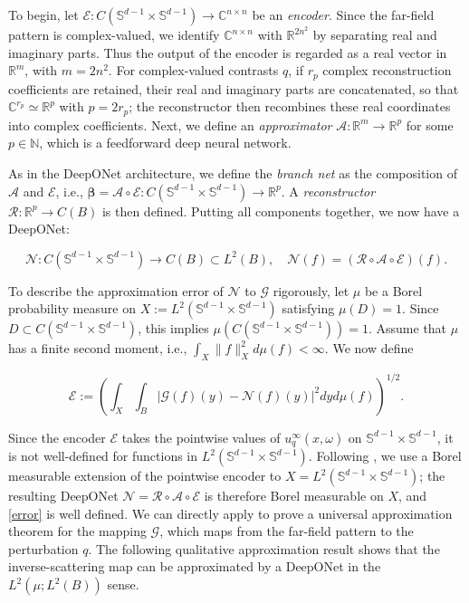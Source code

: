 \documentclass{article}
\numberwithin{equation}{section}
\theoremstyle{plain}
\begin{document}
	To begin, let $\mathcal{E}:C(\mathbb{S}^{d-1}\times\mathbb{S}^{d-1}) \to\mathbb{C}^{n\times n}$ be an \textit{encoder}. Since the far-field pattern is complex-valued, we identify
	\(\mathbb C^{n\times n}\) with \(\mathbb R^{2n^2}\) by separating real and imaginary parts. Thus the output of the encoder is regarded as a real vector in \(\mathbb R^m\), with \(m=2n^2\). For complex-valued contrasts $q$, if $r_p$ complex reconstruction coefficients are retained, their real and imaginary parts are concatenated, so that $\mathbb C^{r_p}\simeq\mathbb R^p$ with $p=2r_p$; the reconstructor then recombines these real coordinates into complex coefficients.
	Next, we define an \textit{approximator} $\mathcal{A}:\mathbb{R}^{m}\to\mathbb{R}^{p}$ for some $p\in\mathbb{N}$, which is a feedforward deep neural network.
	
	As in the DeepONet architecture, we define the \textit{branch net} as the composition of $\mathcal{A}$ and $\mathcal{E}$, i.e., $\boldsymbol{\beta}=\mathcal{A}\circ\mathcal{E}:C(\mathbb{S}^{d-1}\times\mathbb{S}^{d-1})\to\mathbb{R}^{p}$. A \textit{reconstructor} $\mathcal{R}:\mathbb{R}^{p}\to C(B)$ is then defined.
	Putting all components together, we now have a DeepONet:
	
	\begin{equation*}
		\mathscr{N}:C(\mathbb{S}^{d-1}\times\mathbb{S}^{d-1})\to C(B)\subset L^{2}(B),\quad\mathscr{N}(f)=(\mathcal{R}\circ\mathcal{A}\circ\mathcal{E})(f).
	\end{equation*}
	
	To describe the approximation error of $\mathscr{N}$ to $\mathscr{G}$ rigorously, let $\mu$ be a Borel probability measure on $X:=L^{2}(\mathbb{S}^{d-1}\times\mathbb{S}^{d-1})$ satisfying $\mu(D)=1$. Since $D\subset C(\mathbb{S}^{d-1}\times\mathbb{S}^{d-1})$, this implies $\mu(C(\mathbb{S}^{d-1}\times\mathbb{S}^{d-1}))=1$. Assume that $\mu$ has a finite second moment, i.e., $\int_{X}\|f\|_{X}^{2}d\mu(f)<\infty$. We now define
	
	\begin{equation}\label{error}
		\mathscr{E}:=\left(\int_{X}\int_{B}|\mathscr{G}(f)(y)-\mathscr{N}(f)(y)|^{2}dy d\mu(f)\right)^{1/2}.
	\end{equation}
	
	Since the encoder $\mathcal{E}$ takes the pointwise values of $u_{q}^{\infty}(\hat{x},\omega)$ on $\mathbb{S}^{d-1}\times\mathbb{S}^{d-1}$, it is not well-defined for functions in $L^{2}(\mathbb{S}^{d-1}\times\mathbb{S}^{d-1})$. Following \cite[Lemma B.1]{LMK22}, we use a Borel measurable extension of the pointwise encoder to $X=L^2(\mathbb S^{d-1}\times\mathbb S^{d-1})$; the resulting DeepONet $\mathscr N=\mathcal R\circ\mathcal A\circ\mathcal E$ is therefore Borel measurable on $X$, and \eqref{error} is well defined. We can directly apply \cite[Theorem 3.1]{LMK22} to prove a universal approximation theorem for the mapping $\mathscr{G}$, which maps from the far-field pattern to the perturbation $q$. The following qualitative approximation result shows that the inverse-scattering map can be approximated by a DeepONet in the $L^2(\mu;L^2(B))$ sense.
\end{document}
